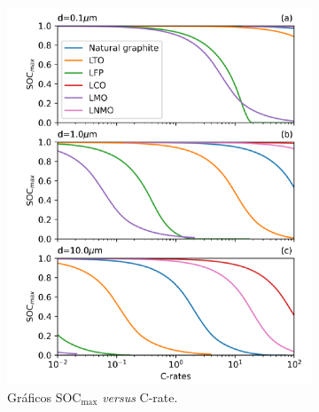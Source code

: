 \begin{figure}[h!]
    \centering
    \begin{subfigure}{.575\textwidth}
        \centering
        \includegraphics[height=.4\textheight]{FastCharging/un/resultados/comparacion/comparacion-curvas.png}
        \caption{Gráficos SOC$_{\max}$ \textit{versus} C-rate.}
        \label{fig:comparacion-curvas}
    \end{subfigure}
    \begin{subfigure}{.375\textwidth}
        \centering

\end{subfigure}
\end{figure}
